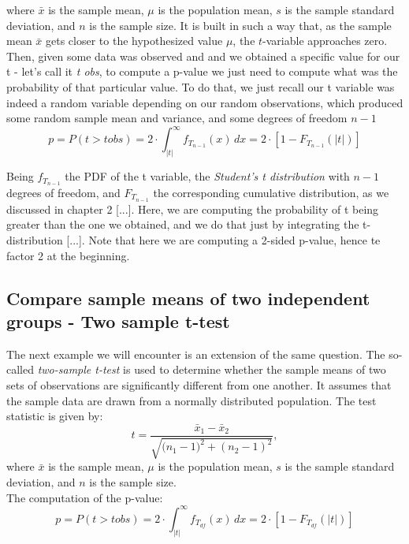 \documentclass{book}
\begin{document}
where $\bar{x}$ is the sample mean, $\mu$ is the population mean, $s$ is the sample standard deviation, and $n$ is the sample size. It is built in such a way that, as the sample mean $\bar{x}$ gets closer to the hypothesized value $\mu$, the $t$-variable approaches zero.\\

Then, given some data was observed and and we obtained a specific value for our t - let's call it \textit{t obs}, to compute a p-value we just need to compute what was the probability of that particular value. To do that, we just recall our t variable was indeed a random variable depending on our random observations, which produced some random sample mean and variance, and some degrees of freedom $n - 1$
\[
p = P\left(t > t obs \right) = 2 \cdot \int_{|t|}^{\infty} f_{T_{n-1}}(x)\,dx = 2 \cdot \left[1 - F_{T_{n-1}}(|t|)\right]
\]

Being $f_{T_{n-1}}$ the PDF of the t variable, the \textit{Student's t distribution} with $n - 1$ degrees of freedom, and $F_{T_{n-1}}$ the corresponding cumulative distribution, as we discussed in chapter 2 [...]. Here, we are computing the probability of t being greater than the one we obtained, and we do that just by integrating the t-distribution [...]. Note that here we are computing a 2-sided p-value, hence te factor 2 at the beginning. 

\newpage

\subsection{Compare sample means of two independent groups - Two sample t-test}

The next example we will encounter is an extension of the same question. The so-called \textit{two-sample t-test} is used to determine whether the sample means of two sets of observations are significantly different from one another. It assumes that the sample data are drawn from a normally distributed population. The test statistic is given by:
\[
    t = \frac{\bar{x}_{1} - \bar{x}_{2}}{\sqrt{\big(n_{1} - 1)^{2} + (n_{2} - 1)^{2}}},
\]
where $\bar{x}$ is the sample mean, $\mu$ is the population mean, $s$ is the sample standard deviation, and $n$ is the sample size.\\

The computation of the p-value:
\[
p = P\left(t > t obs \right) = 2 \cdot \int_{|t|}^{\infty} f_{T_{df}}(x)\,dx = 2 \cdot \left[1 - F_{T_{df}}(|t|)\right]
\]
\end{document}
